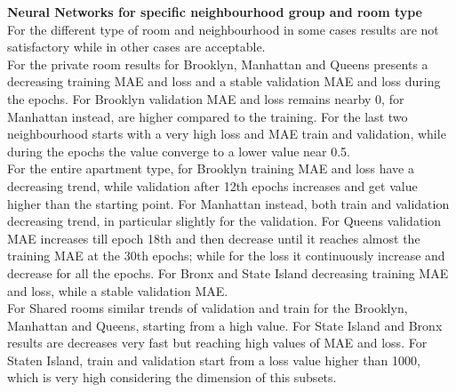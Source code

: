 \documentclass{FR16}
\begin{document}
\newpage 
\noindent \textbf{Neural Networks  for specific neighbourhood group and room type}\\
For the different type of room and neighbourhood in some cases results are not satisfactory while in other cases are acceptable. \\ For the private room results for Brooklyn, Manhattan and Queens presents a decreasing training MAE and loss and a stable validation MAE and loss during the epochs. For Brooklyn validation MAE and loss remains nearby 0, for Manhattan instead, are higher compared to the training. For the last two neighbourhood starts with a very high loss and MAE train and validation, while during the epochs the value converge to a lower value near 0.5.
\\ For the entire apartment type, for Brooklyn training MAE and loss have a decreasing trend, while validation after 12th epochs increases and get value higher than the starting point. 
For Manhattan instead, both train and validation decreasing trend, in particular slightly for the validation. For Queens validation MAE increases till epoch 18th and then decrease until it reaches almost the training MAE at the 30th epochs; while for the loss it continuously increase and decrease for all the epochs. For Bronx and State Island decreasing training MAE and loss, while a stable validation MAE.  \\ For Shared rooms similar trends of validation and train for the Brooklyn, Manhattan and Queens, starting from a high value. For State Island and Bronx results are decreases very fast but reaching high values of MAE and loss. For Staten Island, train and validation start from a loss value higher than 1000, which is very high considering the dimension of this subsets.  
\end{document}
